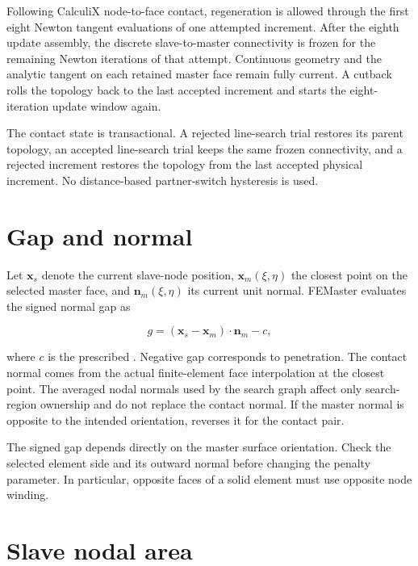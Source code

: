 Following CalculiX node-to-face contact, regeneration is allowed through the first eight Newton tangent evaluations of one attempted increment. After the eighth update assembly, the discrete slave-to-master connectivity is frozen for the remaining Newton iterations of that attempt. Continuous geometry and the analytic tangent on each retained master face remain fully current. A cutback rolls the topology back to the last accepted increment and starts the eight-iteration update window again.

The contact state is transactional. A rejected line-search trial restores its parent topology, an accepted line-search trial keeps the same frozen connectivity, and a rejected increment restores the topology from the last accepted physical increment. No distance-based partner-switch hysteresis is used.

\section{Gap and normal}

Let \(\mathbf{x}_s\) denote the current slave-node position, \(\mathbf{x}_m(\xi,\eta)\) the closest point on the selected master face, and \(\mathbf{n}_m(\xi,\eta)\) its current unit normal. FEMaster evaluates the signed normal gap as

\[
    g = \left(\mathbf{x}_s-\mathbf{x}_m\right)\cdot\mathbf{n}_m-c,
\]

where \(c\) is the prescribed . Negative gap corresponds to penetration. The contact normal comes from the actual finite-element face interpolation at the closest point. The averaged nodal normals used by the search graph affect only search-region ownership and do not replace the contact normal. If the master normal is opposite to the intended orientation,  reverses it for the contact pair.

\begin{warningbox}
The signed gap depends directly on the master surface orientation. Check the selected element side and its outward normal before changing the penalty parameter. In particular, opposite faces of a solid element must use opposite node winding.
\end{warningbox}

\section{Slave nodal area}

